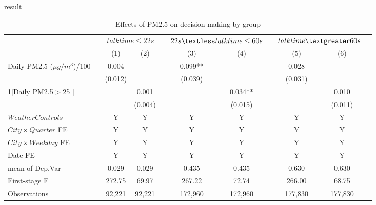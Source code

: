\documentclass[compress]{beamer}
\newcommand{\sym}[1]{#1}
\begin{document}
	\begin{frame}{result}
		\begin{table} \footnotesize
			\centering
			\caption{Effects of PM2.5 on decision making by group}
			\begin{tabular}{llccccccccc}
				\toprule
				&  & \multicolumn{2}{c}{$talk time\leq 22s$}          &  & \multicolumn{2}{c}{$22s\textless talk time\leq 60s$}    &  & \multicolumn{2}{c}{$talk time\textgreater 60s$}\\
				&  & (1)     & (2)   & &  (3) & (4)  && (5)  & (6)        \\
				\cline{3-4} \cline{6-7} \cline{9-10}
				
				Daily PM2.5 ($\mu g/m^{3}$)/100          && 0.004  &         && 0.099\sym{**}       &       && 0.028  &   \\
				&& (0.012) &         &&  (0.039)      &     &&(0.031)    &     \\
				
				1[Daily PM2.5$>$25 ]        &&          &0.001      &&       &0.034\sym{**}        &&     &0.010              \\
				&&          &(0.004)    &&       &(0.015)              &&     &(0.011)     \\
				
				
				
				$Weather Controls$             &  & Y     &Y       & &Y   &Y    &  & Y    &Y     &  \\
				$City \times Quarter$  FE        &  & Y        &Y        & &Y   &Y    &  & Y    &Y     & \\
				$City \times Weekday$  FE        &  & Y        &Y        & &Y   &Y    &  & Y    &Y     & \\
				Date FE                          &  & Y        &Y        & &Y   &Y    &  & Y    &Y     &  \\
				
				
				mean of Dep.Var             &  & 0.029      &0.029     & &0.435   &  0.435     & & 0.630   & 0.630 &   \\
				
				First-stage F       &  & 272.75      &69.97    &   &267.22 & 72.74    & &266.00 &   68.75 &  \\
				
				Observations                   &  & 92,221    &92,221  &  &172,960  &  172,960  & & 177,830  & 177,830   & \\
				
				
				\bottomrule
			\end{tabular}
		\end{table}
	\end{frame}
	
\end{document}
